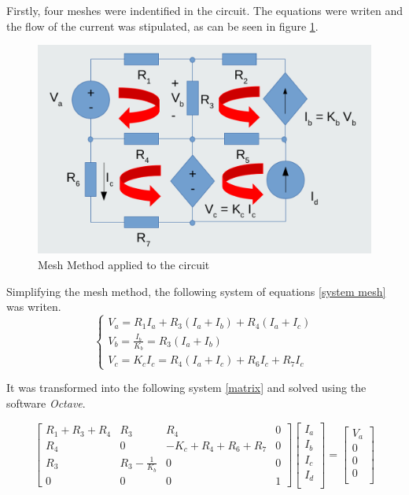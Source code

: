 \par Firstly, four meshes were indentified in the circuit. The equations were writen and the flow of the current was stipulated, as can be seen in figure \ref{mesh}. 

\begin{figure}[H]
    \includegraphics[width=0.5\linewidth]{Mesh.png}
    \centering
    \caption{Mesh Method applied to the circuit}
    \label{mesh}
\end{figure}

\par Simplifying the mesh method, the following system of equations \ref{system mesh} was writen. 
$$
\begin{cases} 
	V_a = R_{1}I_{a}+R_{3}(I_{a}+I_{b})+R_{4}(I_{a}+I_{c}) \\ 
	V_b = \frac{I_{b}}{K_{b}} = R_{3}(I_{a}+I_{b}) \\ 
	V_c = K_{c}I_{c} = R_{4}(I_{a}+I_{c})+R_{6}I_{c}+R_{7}I_{c}
\label{system mesh}
\end{cases}
$$


\par It was transformed into the following system \ref{matrix} and solved using the software \textit{Octave}. 

\begin{equation}
	\begin{bmatrix}
		R_1+R_3+R_4 & R_3 & R_4 & 0 \\
		R_4 & 0 & -K_c+R_4+R_6+R_7 & 0 \\
		R_3 & R_3-\frac{1}{K_b} & 0 & 0 \\
		0 & 0 & 0 & 1
	\end{bmatrix}
	\begin{bmatrix}
		I_a     \\
		I_b     \\
		I_c \\
		I_d     \\
	\end{bmatrix}
    =
	\begin{bmatrix}
		V_a     \\
		0     \\
		0  \\
		0     \\
	\end{bmatrix}
	\label{matrix}
\end{equation}

